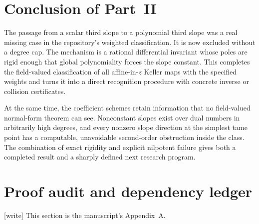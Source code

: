 \documentclass[11pt,a4paper]{article}
\numberwithin{equation}{section}
\theoremstyle{definition}
\theoremstyle{remark}
\begin{document}
\section{Conclusion of Part~II}
\label{wkr:as:sec:conclusion}

The passage from a scalar third slope to a polynomial third slope was a
real missing case in the repository's weighted classification. It is now
excluded without a degree cap. The mechanism is a rational differential
invariant whose poles are rigid enough that global polynomiality forces
the slope constant. This completes the field-valued classification of
all affine-in-$z$ Keller maps with the specified weights and turns it
into a direct recognition procedure with concrete inverse or collision
certificates.

At the same time, the coefficient schemes retain information that no
field-valued normal-form theorem can see. Nonconstant slopes exist over
dual numbers in arbitrarily high degrees, and every nonzero slope
direction at the simplest tame point has a computable, unavoidable
second-order obstruction inside the class. The combination of exact
rigidity and explicit nilpotent failure gives both a completed result and
a sharply defined next research program.

\section{Proof audit and dependency ledger}
\label{wkr:as:app:audit}

\textup{[write]} This section is the manuscript's Appendix~A.
\end{document}
